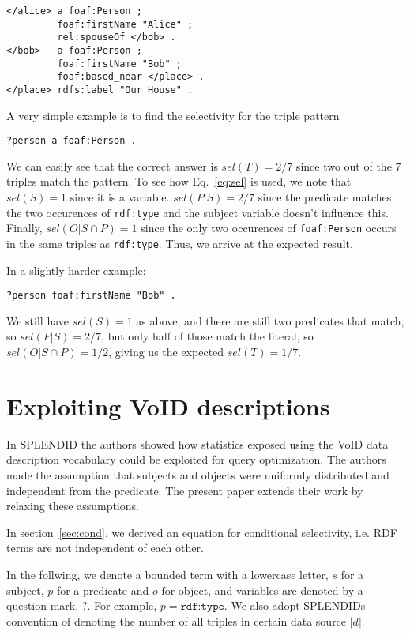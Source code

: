 \documentclass[12pt, draft]{article}
\newcommand{\rdfterm}[1]{\texttt{#1}}
\begin{document}
\begin{verbatim}
</alice> a foaf:Person ;
         foaf:firstName "Alice" ;
         rel:spouseOf </bob> .
</bob>   a foaf:Person ;
         foaf:firstName "Bob" ;
         foaf:based_near </place> .
</place> rdfs:label "Our House" .
\end{verbatim}

A very simple example is to find the selectivity for the triple pattern
\begin{verbatim}
?person a foaf:Person .
\end{verbatim}
We can easily see that the correct answer is $sel(T) = 2/7$ since two
out of the 7 triples match the pattern. To see how Eq.~\ref{eq:sel} is
used, we note that $sel(S) = 1$ since it is a variable. $sel(P | S) =
2/7$ since the predicate matches the two occurences of
\rdfterm{rdf:type} and the subject variable doesn't influence
this. Finally, $sel(O | S \cap P) = 1$ since the only two occurences
of \rdfterm{foaf:Person} occurs in the same triples as
\rdfterm{rdf:type}. Thus, we arrive at the expected result.

In a slightly harder example:
\begin{verbatim}
?person foaf:firstName "Bob" .
\end{verbatim}
We still have $sel(S) = 1$ as above, and there are still two
predicates that match, so $sel(P | S) = 2/7$, but only half of those
match the literal, so $sel(O | S \cap P) = 1/2$, giving us the
expected $sel(T) = 1/7$.

\section{Exploiting VoID descriptions}

In SPLENDID\cite{splendid} the authors showed how statistics exposed
using the VoID data description vocabulary\cite{void} could be
exploited for query optimization. The authors made the assumption that
subjects and objects were uniformly distributed and independent from
the predicate. The present paper extends their work by relaxing these
assumptions.

In section~\ref{sec:cond}, we derived an equation for conditional
selectivity, i.e. RDF terms are not independent of each
other.
 
In the follwing, we denote a bounded term with a lowercase letter, $s$
for a subject, $p$ for a predicate and $o$ for object, and variables
are denoted by a question mark, $?$. For example, $p =
\rdfterm{rdf:type}$. We also adopt SPLENDIDs convention of denoting
the number of all triples in certain data source $|d|$.
\end{document}
